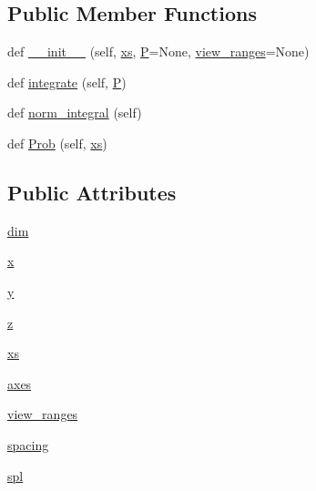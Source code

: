 \subsection*{Public Member Functions}
\begin{DoxyCompactItemize}
\item 
def \mbox{\hyperlink{classgetdist_1_1densities_1_1DensityND_a0d9831e499b76b49e4c0770379266f62}{\+\_\+\+\_\+init\+\_\+\+\_\+}} (self, \mbox{\hyperlink{classgetdist_1_1densities_1_1DensityND_ab13b051ce34b753cced449a138961be5}{xs}}, \mbox{\hyperlink{classgetdist_1_1densities_1_1GridDensity_aad3d52edbfbf1a94ecbd0c779bd39dc2}{P}}=None, \mbox{\hyperlink{classgetdist_1_1densities_1_1DensityND_a600880c8f50c715a7dfdbbf1d02e0575}{view\+\_\+ranges}}=None)
\item 
def \mbox{\hyperlink{classgetdist_1_1densities_1_1DensityND_a3fb464e026c38d7c6d6b7ae399f6ebfa}{integrate}} (self, \mbox{\hyperlink{classgetdist_1_1densities_1_1GridDensity_aad3d52edbfbf1a94ecbd0c779bd39dc2}{P}})
\item 
def \mbox{\hyperlink{classgetdist_1_1densities_1_1DensityND_a6967eace9747b5521051c675036db2d8}{norm\+\_\+integral}} (self)
\item 
def \mbox{\hyperlink{classgetdist_1_1densities_1_1DensityND_a4e43700140c1f543d4b079bb8e4906c3}{Prob}} (self, \mbox{\hyperlink{classgetdist_1_1densities_1_1DensityND_ab13b051ce34b753cced449a138961be5}{xs}})
\end{DoxyCompactItemize}
\subsection*{Public Attributes}
\begin{DoxyCompactItemize}
\item 
\mbox{\hyperlink{classgetdist_1_1densities_1_1DensityND_a4c9baae428667fed4fb9d8d782b33899}{dim}}
\item 
\mbox{\hyperlink{classgetdist_1_1densities_1_1DensityND_a64171c94b941d4f8c81878c89ff09b58}{x}}
\item 
\mbox{\hyperlink{classgetdist_1_1densities_1_1DensityND_a3fe3c64bed4fafb4556be376a61a77d6}{y}}
\item 
\mbox{\hyperlink{classgetdist_1_1densities_1_1DensityND_a5d61fa7c946b722f898a52a5d6110634}{z}}
\item 
\mbox{\hyperlink{classgetdist_1_1densities_1_1DensityND_ab13b051ce34b753cced449a138961be5}{xs}}
\item 
\mbox{\hyperlink{classgetdist_1_1densities_1_1DensityND_af1d309d831384b23e4c7a9efde25ebfd}{axes}}
\item 
\mbox{\hyperlink{classgetdist_1_1densities_1_1DensityND_a600880c8f50c715a7dfdbbf1d02e0575}{view\+\_\+ranges}}
\item 
\mbox{\hyperlink{classgetdist_1_1densities_1_1DensityND_a86fbc194e6aa77cc72dac8cdde269855}{spacing}}
\item 
\mbox{\hyperlink{classgetdist_1_1densities_1_1DensityND_a33ddddd892343048d7adfcb4b3c949ea}{spl}}
\end{DoxyCompactItemize}
